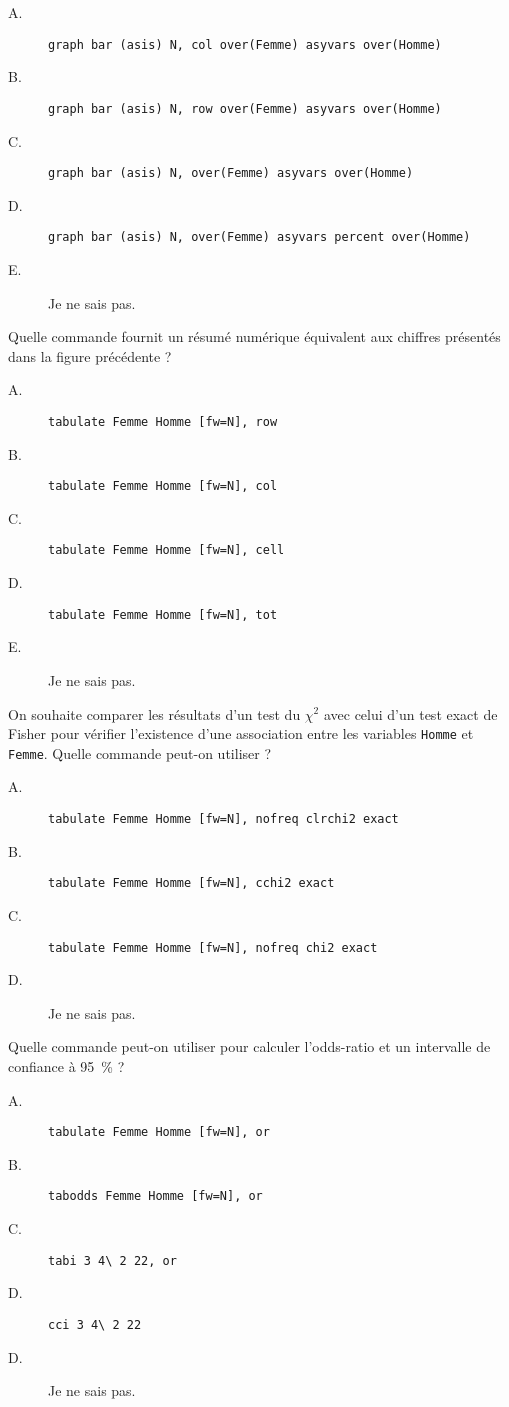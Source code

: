 \begin{description}
\begin{center}
  \end{center}
  \begin{description}
  \item[A.] \verb|graph bar (asis) N, col over(Femme) asyvars over(Homme)|
  \item[B.] \verb|graph bar (asis) N, row over(Femme) asyvars over(Homme)|
  \item[C.] \verb|graph bar (asis) N, over(Femme) asyvars over(Homme)|
  \item[D.] \verb|graph bar (asis) N, over(Femme) asyvars percent over(Homme)|
  \item[E.] Je ne sais pas.
  \end{description}  
\item[\bf 1.4] Quelle commande fournit un résumé numérique équivalent aux
  chiffres présentés dans la figure précédente ?  
  \begin{description}
  \item[A.] \verb|tabulate Femme Homme [fw=N], row|
  \item[B.] \verb|tabulate Femme Homme [fw=N], col|
  \item[C.] \verb|tabulate Femme Homme [fw=N], cell|
  \item[D.] \verb|tabulate Femme Homme [fw=N], tot|
  \item[E.] Je ne sais pas.
  \end{description}  
\item[\bf 1.5] On souhaite comparer les résultats d'un test du $\chi^2$ avec
  celui d'un test exact de Fisher pour vérifier l'existence d'une
  association entre les variables \texttt{Homme} et \texttt{Femme}. Quelle
  commande peut-on utiliser ? 
  \begin{description}
  \item[A.] \verb|tabulate Femme Homme [fw=N], nofreq clrchi2 exact|
  \item[B.] \verb|tabulate Femme Homme [fw=N], cchi2 exact|
  \item[C.] \verb|tabulate Femme Homme [fw=N], nofreq chi2 exact|
  \item[D.] Je ne sais pas.
  \end{description}  
\item[\bf 1.6] Quelle commande peut-on utiliser pour calculer l'odds-ratio
  et un intervalle de confiance à 95~\% ? 
  \begin{description}
  \item[A.] \verb|tabulate Femme Homme [fw=N], or|
  \item[B.] \verb|tabodds Femme Homme [fw=N], or|
  \item[C.] \verb|tabi 3 4\ 2 22, or|
  \item[D.] \verb|cci 3 4\ 2 22|
  \item[D.] Je ne sais pas.
  \end{description}  
\end{description}

